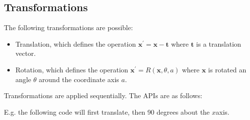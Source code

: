 \documentclass[letterpaper,10pt,english]{sphinxmanual}
\begin{document}
\subsection{Transformations}
\label{\detokenize{ImplemSDF:transformations}}
\sphinxAtStartPar
The following transformations are possible:
\begin{itemize}
\item {} 
\sphinxAtStartPar
Translation, which defines the operation \(\mathbf{x}^\prime = \mathbf{x} - \mathbf{t}\) where \(\mathbf{t}\) is a translation vector.

\item {} 
\sphinxAtStartPar
Rotation, which defines the operation \(\mathbf{x}^\prime = R\left(\mathbf{x}, \theta, a\right)\) where \(\mathbf{x}\) is rotated an angle \(\theta\) around the coordinate axis \(a\).

\end{itemize}

\sphinxAtStartPar
Transformations are applied sequentially.
The APIs are as follows:

\begin{sphinxVerbatim}[commandchars=\\\{\}]
      
        
\end{sphinxVerbatim}

\sphinxAtStartPar
E.g. the following code will first translate, then 90 degrees about the \(x\)\sphinxhyphen{}axis.

\begin{sphinxVerbatim}[commandchars=\\\{\}]
 

 
\end{sphinxVerbatim}
\end{document}
